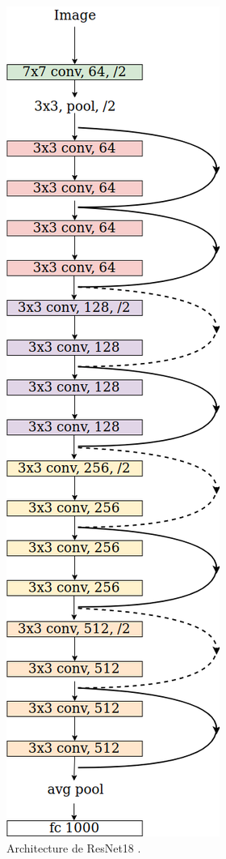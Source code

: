 \begin{figure}[hbt!]
    \centering
    \includegraphics[scale=0.4]{Figures/resnet18_architecture.png}
    \caption{Architecture de ResNet18 \cite{thatsnotmyname71_what_2019}.}
    \label{fig:resnet18_architecture}
\end{figure}

